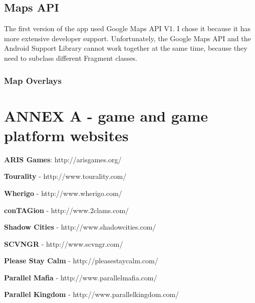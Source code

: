 \documentclass{article}
\begin{document}
\subsection{Maps API}

The first version of the app used Google Maps API V1. I chose it because it has
more extensive developer support. Unfortunately, the Google Maps API and the
Android Support Library cannot work together at the same time, because they need
to subclass different Fragment classes.

\subsubsection{Map Overlays}



 






\section{ANNEX A - game and game platform websites}



\nocite{teamtags}
\nocite{gps1}



\textbf{ARIS Games}: http://arisgames.org/ \newline

\textbf{Tourality} - http://www.tourality.com/ \newline

\textbf{Wherigo} - http://www.wherigo.com/ \newline

\textbf{conTAGion} - http://www.2clams.com/ \newline

\textbf{Shadow Cities} - http://www.shadowcities.com/ \newline

\textbf{SCVNGR} - http://www.scvngr.com/ \newline

\textbf{Please Stay Calm} - http://pleasestaycalm.com/ \newline

\textbf{Parallel Mafia} - http://www.parallelmafia.com/ \newline

\textbf{Parallel Kingdom} - http://www.parallelkingdom.com/ \newline
\end{document}
